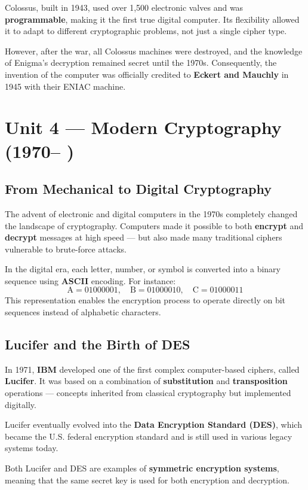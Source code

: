 Colossus, built in 1943, used over 1,500 electronic valves and was \textbf{programmable}, making it the first true digital computer.  
Its flexibility allowed it to adapt to different cryptographic problems, not just a single cipher type.

However, after the war, all Colossus machines were destroyed, and the knowledge of Enigma’s decryption remained secret until the 1970s.  
Consequently, the invention of the computer was officially credited to \textbf{Eckert and Mauchly} in 1945 with their ENIAC machine.

\section{Unit 4 — Modern Cryptography (1970– )}

\subsection{From Mechanical to Digital Cryptography}

The advent of electronic and digital computers in the 1970s completely changed the landscape of cryptography.  
Computers made it possible to both \textbf{encrypt} and \textbf{decrypt} messages at high speed — but also made many traditional ciphers vulnerable to brute-force attacks.

In the digital era, each letter, number, or symbol is converted into a binary sequence using \textbf{ASCII} encoding.  
For instance:
\[
\text{A} = 01000001, \quad \text{B} = 01000010, \quad \text{C} = 01000011
\]
This representation enables the encryption process to operate directly on bit sequences instead of alphabetic characters.

\subsection{Lucifer and the Birth of DES}

In 1971, \textbf{IBM} developed one of the first complex computer-based ciphers, called \textbf{Lucifer}.  
It was based on a combination of \textbf{substitution} and \textbf{transposition} operations — concepts inherited from classical cryptography but implemented digitally.

Lucifer eventually evolved into the \textbf{Data Encryption Standard (DES)}, which became the U.S. federal encryption standard and is still used in various legacy systems today.

Both Lucifer and DES are examples of \textbf{symmetric encryption systems}, meaning that the same secret key is used for both encryption and decryption.

